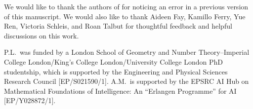 \documentclass[10pt]{article}
\theoremstyle{definition}
\theoremstyle{remark}
\begin{document}
We would like to thank the authors of \cite{stargalla2025computational} for noticing an error in a previous version of this manuscript. We would also like to thank Aideen Fay, Kamillo Ferry, Yue Ren, Victoria Schleis, and Roan Talbut for thoughtful feedback and helpful discussions on this work. 

P.L.~was funded by a London School of Geometry and Number Theory--Imperial College London/King's College London/University College London PhD studentship, which is supported by the Engineering and Physical Sciences Research Council [EP/S021590/1]. A.M.~is supported by the EPSRC AI Hub on Mathematical Foundations of Intelligence: An ``Erlangen Programme'' for AI [EP/Y028872/1].


\clearpage
\newpage


\end{document}
